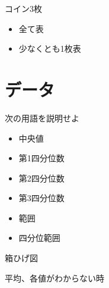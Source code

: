 \documentclass[10pt]{jsarticle}
\begin{document}
\begin{itembox}[l]{コイン3枚}
	\begin{multicols}{2}
		\begin{itemize}
			\item 全て表\vspace{5mm}
			\item 少なくとも1枚表\vspace{5mm}
		\end{itemize}
	\end{multicols}
\end{itembox}

\section{データ}
\begin{itembox}[l]{次の用語を説明せよ}
	\begin{multicols}{2}
		\begin{itemize}
			\item 中央値\vspace{5mm}
			\item 第1四分位数\vspace{5mm}
			\item 第2四分位数\vspace{5mm}
			\item 第3四分位数\vspace{5mm}
			\item 範囲\vspace{5mm}
			\item 四分位範囲\vspace{5mm}
		\end{itemize}
	\end{multicols}
\end{itembox}
\begin{itembox}[l]{箱ひげ図}
	\vspace{30mm}
\end{itembox}
\begin{itembox}[l]{平均、各値がわからない時}
	\vspace{2cm}
\end{itembox}
\end{document}
